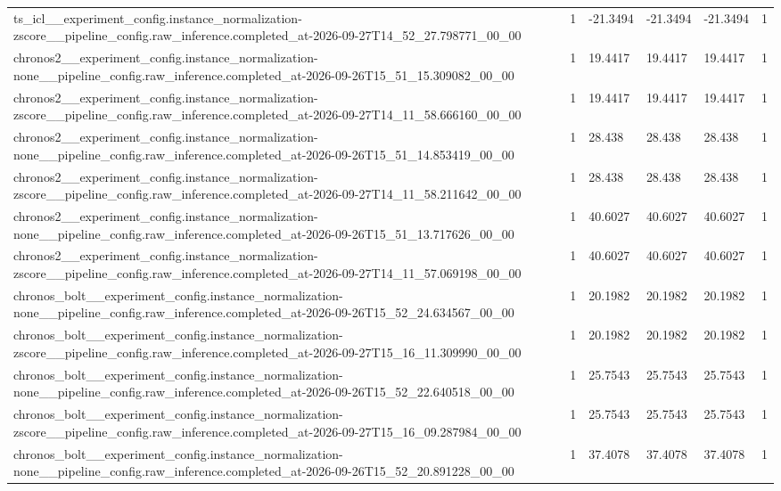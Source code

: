 \begin{tabular}{llllll}
ts\_icl\_\_experiment\_config.instance\_normalization-zscore\_\_pipeline\_config.raw\_inference.completed\_at-2026-09-27T14\_52\_27.798771\_00\_00 & 1 & -21.3494 & -21.3494 & -21.3494 & 1 \\
chronos2\_\_experiment\_config.instance\_normalization-none\_\_pipeline\_config.raw\_inference.completed\_at-2026-09-26T15\_51\_15.309082\_00\_00 & 1 & 19.4417 & 19.4417 & 19.4417 & 1 \\
chronos2\_\_experiment\_config.instance\_normalization-zscore\_\_pipeline\_config.raw\_inference.completed\_at-2026-09-27T14\_11\_58.666160\_00\_00 & 1 & 19.4417 & 19.4417 & 19.4417 & 1 \\
chronos2\_\_experiment\_config.instance\_normalization-none\_\_pipeline\_config.raw\_inference.completed\_at-2026-09-26T15\_51\_14.853419\_00\_00 & 1 & 28.438 & 28.438 & 28.438 & 1 \\
chronos2\_\_experiment\_config.instance\_normalization-zscore\_\_pipeline\_config.raw\_inference.completed\_at-2026-09-27T14\_11\_58.211642\_00\_00 & 1 & 28.438 & 28.438 & 28.438 & 1 \\
chronos2\_\_experiment\_config.instance\_normalization-none\_\_pipeline\_config.raw\_inference.completed\_at-2026-09-26T15\_51\_13.717626\_00\_00 & 1 & 40.6027 & 40.6027 & 40.6027 & 1 \\
chronos2\_\_experiment\_config.instance\_normalization-zscore\_\_pipeline\_config.raw\_inference.completed\_at-2026-09-27T14\_11\_57.069198\_00\_00 & 1 & 40.6027 & 40.6027 & 40.6027 & 1 \\
chronos\_bolt\_\_experiment\_config.instance\_normalization-none\_\_pipeline\_config.raw\_inference.completed\_at-2026-09-26T15\_52\_24.634567\_00\_00 & 1 & 20.1982 & 20.1982 & 20.1982 & 1 \\
chronos\_bolt\_\_experiment\_config.instance\_normalization-zscore\_\_pipeline\_config.raw\_inference.completed\_at-2026-09-27T15\_16\_11.309990\_00\_00 & 1 & 20.1982 & 20.1982 & 20.1982 & 1 \\
chronos\_bolt\_\_experiment\_config.instance\_normalization-none\_\_pipeline\_config.raw\_inference.completed\_at-2026-09-26T15\_52\_22.640518\_00\_00 & 1 & 25.7543 & 25.7543 & 25.7543 & 1 \\
chronos\_bolt\_\_experiment\_config.instance\_normalization-zscore\_\_pipeline\_config.raw\_inference.completed\_at-2026-09-27T15\_16\_09.287984\_00\_00 & 1 & 25.7543 & 25.7543 & 25.7543 & 1 \\
chronos\_bolt\_\_experiment\_config.instance\_normalization-none\_\_pipeline\_config.raw\_inference.completed\_at-2026-09-26T15\_52\_20.891228\_00\_00 & 1 & 37.4078 & 37.4078 & 37.4078 & 1 \\

\end{tabular}
